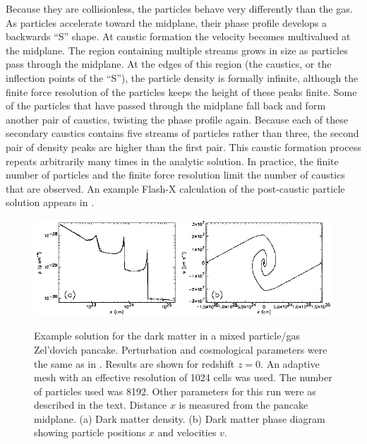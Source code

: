 Because they are collisionless, the particles behave very
differently than the gas.  As particles accelerate toward the
midplane, their phase profile develops a backwards ``S'' shape. At
caustic formation the velocity becomes multivalued at the midplane.
The region containing multiple streams grows in size as particles
pass through the midplane. At the edges of this region (the
caustics, or the inflection points of the ``S''), the particle
density is formally infinite, although the finite force resolution
of the particles keeps the height of these peaks finite. Some of the
particles that have passed through the midplane fall back and form
another pair of caustics, twisting the phase profile again. Because
each of these secondary caustics contains five streams of particles
rather than three, the second pair of density peaks are higher than
the first pair. This caustic formation process repeats arbitrarily
many times in the analytic solution. In practice, the finite number
of particles and the finite force resolution limit the number of
caustics that are observed. An example Flash-X calculation of the
post-caustic particle solution appears in .

\begin{figure}[!t]
\begin{center}
{\leavevmode\includegraphics[width=5.5in]{Pancake_dm}}
\end{center}
\caption[Example solution for the dark
matter in a mixed Zel'dovich pancake]{\label{Fig:dm pancake}Example
solution for the dark
matter in a mixed particle/gas Zel'dovich pancake. Perturbation and
cosmological parameters were the same as in
.
Results are shown for redshift $z=0$. An adaptive mesh
with an effective resolution of 1024 cells was used. The number of
particles used was 8192. Other parameters for this run were as
described in the text. Distance $x$ is measured from the pancake
midplane. (a) Dark matter density. (b) Dark matter phase diagram
showing particle positions $x$ and velocities $v$. }
\end{figure}

